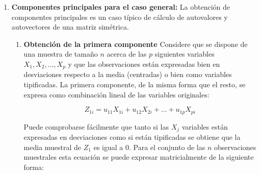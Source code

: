 \begin{enumerate}
    Así mismo deben de cumplir las condiciones arbitrarias pero necesarias de que los ejes sean ortogonales \eqref{eq:ort} y fijar las escalas de medida \eqref{eq:medi}
    \begin{equation}
    u_{11}^2 + u_{12}^2 = 1 \quad ; \quad u_{21}^2 + u_{22}^2 = 1
    \label{eq:ort}
    \end{equation}
    \begin{equation}
    u_{11}u_{21} + u_{21}u_{22}=0 
    \label{eq:medi}
    \end{equation}
    En el análisis de componentes principales es importante conocer la correlación de cada variable con las componentes para tener una medida de lo importante que es cada variable en la interpretación del compoente principal. A este se le denomina \textbf{carga factorial} $l_{hj}$ entre la componente $h$-\'esima y la variable $j$-\'esima viene dada por:

    \begin{equation}
    l_{hj} = \frac{u_{hj}}{\hat{s_j}}\sqrt{{\lambda}_{h}}}
    \label{eq:car_fac}
    \end{equation}

    Donde la única notación no conocida es $\hat{s_j}$ que viene a ser la desviación típica de la variable $j$-\'esima

    \item \textbf{Componentes principales para el caso general:} La obtención de componentes principales es un caso típico de cálculo de autovalores y autovectores de una matriz simétrica.

    \begin{enumerate}
        \item \textbf{Obtención de la primera componente} Considere que se dispone de una muestra de tamaño $n$ acerca de las $p$ siguientes variables $X_1,X_2,\ldots,X_p$ y que las observaciones están expresadas bien en desviaciones respecto a la media (centradas) o bien como variables tipificadas. La primera componente, de la misma forma que el resto, se expresa como combinación lineal de las variables originales:

        \begin{equation}
        Z_{1i} = u_{11}X_{1i} + u_{12}X_{2i} + \ldots + u_{1p}X_{pi}
        \label{eq:comb_lina_comp}
        \end{equation}

        Puede comprobarse fácilmente que tanto si las $X_j$ variables están expresadas en desviaciones como si están tipificadas se obtiene que la media muestral de $Z_1$ es igual a $0$.
        Para el conjunto de las $n$ observaciones muestrales esta ecuación se puede expresar matricialmente de la siguiente forma:


\end{enumerate}
\end{enumerate}
